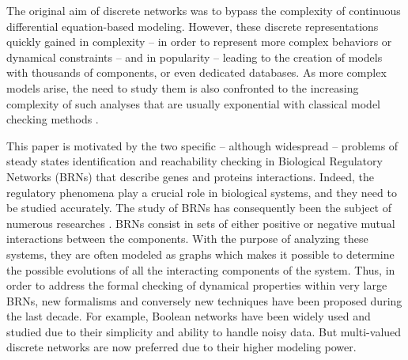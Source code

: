 
The original aim of discrete networks \cite{kauffman69,Thomas73} was to bypass the complexity of
continuous differential equation-based modeling.
However, these discrete representations quickly gained in complexity -- in order to represent more complex behaviors or dynamical constraints --
and in popularity -- leading to the creation of models with thousands of components, or even dedicated databases.
As more complex models arise, the need to study them is also confronted to the increasing complexity of such analyses
that are usually exponential with classical model checking methods \cite{Harel02}.

This paper is motivated by the two specific -- although widespread -- problems of steady states identification and reachability checking in Biological Regulatory Networks (BRNs) that describe genes and proteins interactions. Indeed, the regulatory phenomena play a crucial role in biological systems, and they need to be studied accurately. The study of BRNs has consequently been the subject of numerous researches \cite{thieffry1999modularity, shermin20092}. BRNs consist in sets of either positive or negative mutual interactions between the components. With the purpose of analyzing these systems, they are often modeled as graphs which makes it possible to determine the possible evolutions of all the interacting components of the system. Thus, in order to address the formal checking of dynamical properties within very large BRNs, new formalisms and conversely new techniques have been proposed during the last decade. For example, Boolean networks \cite{stuart1993origins} have been widely used and studied due to their simplicity and ability to handle noisy data. But multi-valued discrete networks are now preferred due to their higher modeling power.

